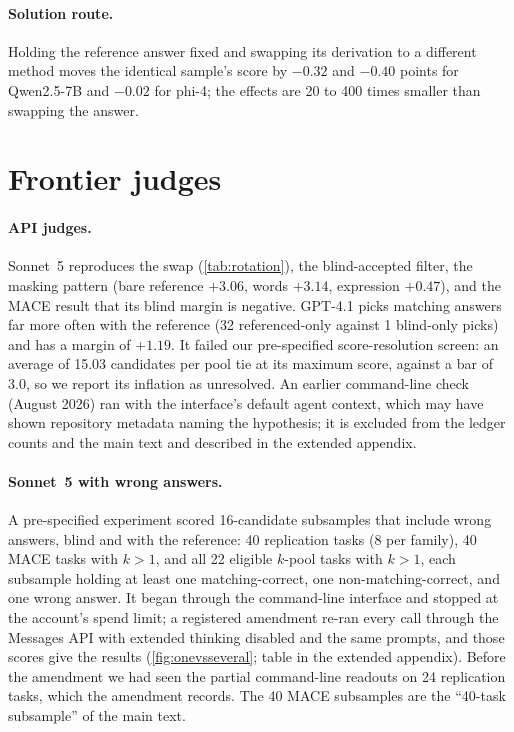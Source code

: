 \paragraph{Solution route.}
Holding the reference answer fixed and swapping its derivation to a different method moves the identical sample's score by $-0.32$ and $-0.40$ points for Qwen2.5-7B and $-0.02$ for phi-4; the effects are 20 to 400 times smaller than swapping the answer.

\FloatBarrier
\section{Frontier judges}
\label{app:frontier}

\paragraph{API judges.}
Sonnet~5 reproduces the swap (\cref{tab:rotation}), the blind-accepted filter, the masking pattern (bare reference $+3.06$, words $+3.14$, expression $+0.47$), and the \textsc{MACE} result that its blind margin is negative. GPT-4.1 picks matching answers far more often with the reference (32 referenced-only against 1 blind-only picks) and has a margin of $+1.19$. It failed our pre-specified score-resolution screen: an average of 15.03 candidates per pool tie at its maximum score, against a bar of 3.0, so we report its inflation as unresolved. An earlier command-line check (August 2026) ran with the interface's default agent context, which may have shown repository metadata naming the hypothesis; it is excluded from the ledger counts and the main text and described in the extended appendix.

\paragraph{Sonnet~5 with wrong answers.}
A pre-specified experiment scored 16-candidate subsamples that include wrong answers, blind and with the reference: 40 replication tasks (8 per family), 40 \textsc{MACE} tasks with $k{>}1$, and all 22 eligible $k$-pool tasks with $k{>}1$, each subsample holding at least one matching-correct, one non-matching-correct, and one wrong answer. It began through the command-line interface and stopped at the account's spend limit; a registered amendment re-ran every call through the Messages API with extended thinking disabled and the same prompts, and those scores give the results (\cref{fig:onevsseveral}; table in the extended appendix).\pre{} Before the amendment we had seen the partial command-line readouts on 24 replication tasks, which the amendment records. The 40 \textsc{MACE} subsamples are the ``40-task subsample'' of the main text.


